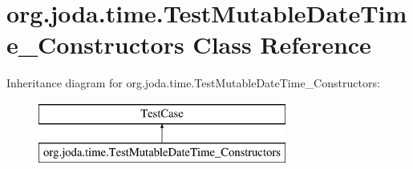 \hypertarget{classorg_1_1joda_1_1time_1_1_test_mutable_date_time___constructors}{\section{org.\-joda.\-time.\-Test\-Mutable\-Date\-Time\-\_\-\-Constructors Class Reference}
\label{classorg_1_1joda_1_1time_1_1_test_mutable_date_time___constructors}
}
Inheritance diagram for org.\-joda.\-time.\-Test\-Mutable\-Date\-Time\-\_\-\-Constructors\-:\begin{figure}[H]
\begin{center}
\leavevmode
\includegraphics[height=2.000000cm]{classorg_1_1joda_1_1time_1_1_test_mutable_date_time___constructors}
\end{center}
\end{figure}
